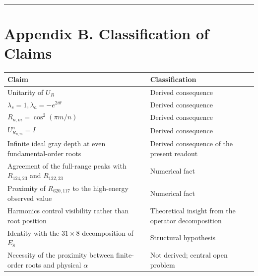 \documentclass[
  10pt,
  a4paper,
]{article}
\newcounter{none} %
\begin{document}
\begin{center}\rule{0.5\linewidth}{0.5pt}\end{center}

\section{Appendix B. Classification of
Claims}\label{appendix-b.-classification-of-claims}

{\def\LTcaptype{none} %
\begin{longtable}[]{@{}
  >{\raggedright\arraybackslash}p{}
  >{\raggedright\arraybackslash}p{}@{}}
\toprule\noalign{}
\begin{minipage}[b]{\linewidth}\raggedright
Claim
\end{minipage} & \begin{minipage}[b]{\linewidth}\raggedright
Classification
\end{minipage} \\
\midrule\noalign{}
\endhead
\bottomrule\noalign{}
\endlastfoot
Unitarity of \(U_R\) & Derived consequence \\
\(\lambda_s=1,\lambda_a=-e^{2i\theta}\) & Derived consequence \\
\(R_{n,m}=\cos^2(\pi m/n)\) & Derived consequence \\
\(U_{R_{n,m}}^n=I\) & Derived consequence \\
Infinite ideal gray depth at even fundamental-order roots & Derived
consequence of the present readout \\
Agreement of the full-range peaks with \(R_{124,23}\) and \(R_{122,23}\)
& Numerical fact \\
Proximity of \(R_{620,117}\) to the high-energy observed value &
Numerical fact \\
Harmonics control visibility rather than root position & Theoretical
insight from the operator decomposition \\
Identity with the \(31\times8\) decomposition of \(E_8\) & Structural
hypothesis \\
Necessity of the proximity between finite-order roots and physical
\(\alpha\) & Not derived; central open problem \\
\end{longtable}
}
\end{document}
